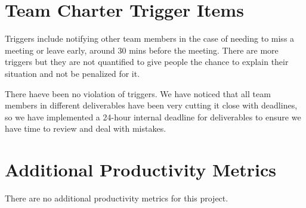 \documentclass{article}
\begin{document}
\section{Team Charter Trigger Items}

Triggers include notifying other team members in the case of needing to miss a meeting or leave early, around 30 mins before the meeting.
There are more triggers but they are not quantified to give people the chance to explain their situation and not be penalized for it.

There haeve been no violation of triggers. We have noticed that all team members in different deliverables have been very cutting it close with deadlines, so we have implemented a 24-hour internal deadline for deliverables to ensure we have time to review and deal with mistakes.

\section{Additional Productivity Metrics}




There are no additional productivity metrics for this project.
\end{document}
